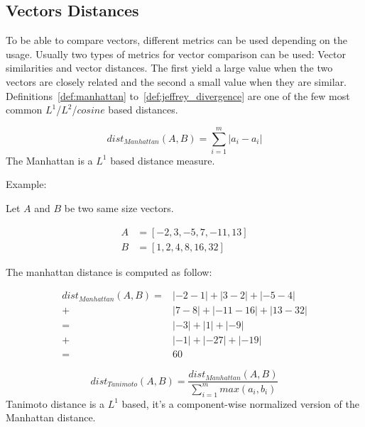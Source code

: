 \subsection{Vectors Distances \label{sec:vectors_distances}}

To be able to compare vectors, different metrics can be used depending on the usage.
Usually two types of metrics for vector comparison can be used: Vector similarities and vector distances.
The first yield a large value when the two vectors are closely related and the second a small value when they are similar.
Definitions~\ref{def:manhattan} to~\ref{def:jeffrey_divergence} are one of the few most common $L^1$/$L^2$/$cosine$ based distances.

\begin{definition}
  \begin{equation}
    dist_{Manhattan}(A, B) = \sum_{i=1}^{m} |a_i - a_i|
  \end{equation}
  The Manhattan is a $L^1$ based distance measure.

  Example:

  Let $A$ and $B$ be two same size vectors.

  \begin{equation}
    \begin{aligned}
      A &= \left[-2, 3, -5, 7, -11, 13 \right] \\
      B &= \left[1, 2, 4, 8, 16, 32 \right]
    \end{aligned}
  \end{equation}

  The manhattan distance is computed as follow:

  \begin{equation}
    \begin{aligned}
      dist_{Manhattan}(A, B) =& |-2 - 1| + |3 - 2| + |-5 - 4| \\
                             +& |7 - 8| + |-11 - 16| + |13 - 32| \\
                             =& |-3| + |1| + |-9| \\
                             +& |-1| + |-27| + |-19| \\
                             =& 60
    \end{aligned}
  \end{equation}
\end{definition}

\begin{definition}
  \begin{equation}
    dist_{Tanimoto}(A, B) = \frac{dist_{Manhattan}(A, B)}{\sum_{i=1}^{m} max(a_i, b_i)}
  \end{equation}
  Tanimoto distance is a $L^1$ based, it's a component-wise normalized version of the Manhattan distance.
\end{definition}

